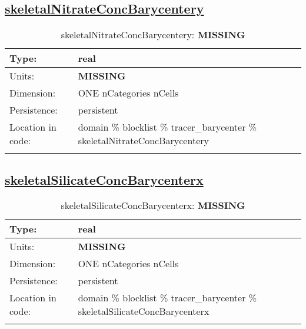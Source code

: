 \subsection[skeletalNitrateConcBarycentery]{\hyperref[sec:var_tab_tracer_barycenter]{skeletalNitrateConcBarycentery}}
\label{subsec:var_sec_tracer_barycenter_skeletalNitrateConcBarycentery}
\begin{center}
\begin{longtable}{| p{2.0in} | p{4.0in} |}
        \hline 
        Type: & real \\
        \hline 
        Units: & {\bf \color{red} MISSING} \\
        \hline 
        Dimension: & ONE nCategories nCells \\
        \hline 
        Persistence: & persistent \\
        \hline 
         Location in code: & domain \% blocklist \% tracer\_barycenter \% skeletalNitrateConcBarycentery \\
         \hline 
    \caption{skeletalNitrateConcBarycentery: {\bf \color{red} MISSING}}
\end{longtable}
\end{center}
\subsection[skeletalSilicateConcBarycenterx]{\hyperref[sec:var_tab_tracer_barycenter]{skeletalSilicateConcBarycenterx}}
\label{subsec:var_sec_tracer_barycenter_skeletalSilicateConcBarycenterx}
\begin{center}
\begin{longtable}{| p{2.0in} | p{4.0in} |}
        \hline 
        Type: & real \\
        \hline 
        Units: & {\bf \color{red} MISSING} \\
        \hline 
        Dimension: & ONE nCategories nCells \\
        \hline 
        Persistence: & persistent \\
        \hline 
         Location in code: & domain \% blocklist \% tracer\_barycenter \% skeletalSilicateConcBarycenterx \\
         \hline 
    \caption{skeletalSilicateConcBarycenterx: {\bf \color{red} MISSING}}
\end{longtable}
\end{center}
